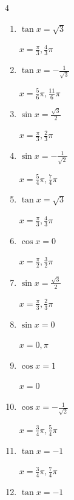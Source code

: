 \begin{multicols}{4}
\begin{enumerate}
  \item $\displaystyle \tan{x}  = \sqrt{3}$

        $\displaystyle x = \frac{\pi}{3} , \frac{4}{3}\pi$

  \item $\displaystyle \tan{x}  = -\frac{1}{\sqrt{3}}$

        $\displaystyle x = \frac{5}{6}\pi , \frac{11}{6}\pi$

  \item $\displaystyle \sin{x}  = \frac{\sqrt{3}}{2}$

        $\displaystyle x = \frac{\pi}{3} , \frac{2}{3}\pi$

\columnbreak %

  \item $\displaystyle \sin{x}  = -\frac{1}{\sqrt{2}}$

        $\displaystyle x = \frac{5}{4}\pi , \frac{7}{4}\pi$

  \item $\displaystyle \tan{x}  = \sqrt{3}$

        $\displaystyle x = \frac{\pi}{3} , \frac{4}{3}\pi$

  \item $\displaystyle \cos{x}  = 0$

        $\displaystyle x = \frac{\pi}{2} , \frac{3}{2}\pi$

  \item $\displaystyle \sin{x}  = \frac{\sqrt{3}}{2}$

        $\displaystyle x = \frac{\pi}{3} , \frac{2}{3}\pi$

  \item $\displaystyle \sin{x}  = 0$

        $\displaystyle x = 0 , \pi$

  \item $\displaystyle \cos{x}  = 1$

        $\displaystyle x = 0$

  \item $\displaystyle \cos{x}  = -\frac{1}{\sqrt{2}}$

        $\displaystyle x = \frac{3}{4}\pi , \frac{5}{4}\pi$

  \item $\displaystyle \tan{x}  = -1$

        $\displaystyle x = \frac{3}{4}\pi , \frac{7}{4}\pi$

  \item $\displaystyle \tan{x}  = -1$


\end{enumerate}
\end{multicols}

